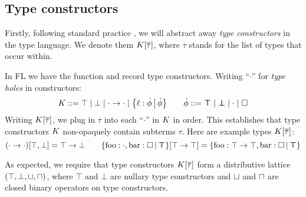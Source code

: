 \subsection{Type constructors}

Firstly, following standard practice \cite{essence-of-ml-type-inference, constraint-based-freeze-ml}, we will abstract away \emph{type constructors} in the type language. We denote them $K[\overline \tau]$, where $\overline \tau$ stands for the list of types that occur within.
\begin{example}
    In FL we have the function and record type constructors. Writing \enquote{$\cdot$} for \emph{type holes} in constructors:
    $$
       \constr ::= \top \mid \bot \mid {\cdot} \to {\cdot} \mid \flext{\ell : \dot \phi}{\dot \phi} \qquad \dot \phi ::= \flftop \mid \flfbot \mid \cdot \mid \flabsent
    $$
    Writing $K[\overline \tau]$, we plug in $\overline \tau$ into each \enquote{$\cdot$} in $K$ in order. This establishes that type constructors $K$ non-opaquely contain subterms $\tau$. Here are example types $K[\overline \tau]$:
    $$
        (\cdot \to \cdot)[\top, \bot] = \top \to \bot \qquad \flext{\mathrm{foo}: \cdot, \mathrm{bar} : \flabsent}{\flftop}[\top \to \top] = \flext{\mathrm{foo}: \top \to \top, \mathrm{bar} : \flabsent}{\flftop}
    $$
\end{example}

\needspace{5em}
As expected, we require that type constructors $K[\overline \tau]$ form a distributive lattice $(\top, \bot, \sqcup, \sqcap)$, where $\top$ and $\bot$ are nullary type constructors and $\sqcup$ and $\sqcap$ are closed binary operators on type constructors. 

